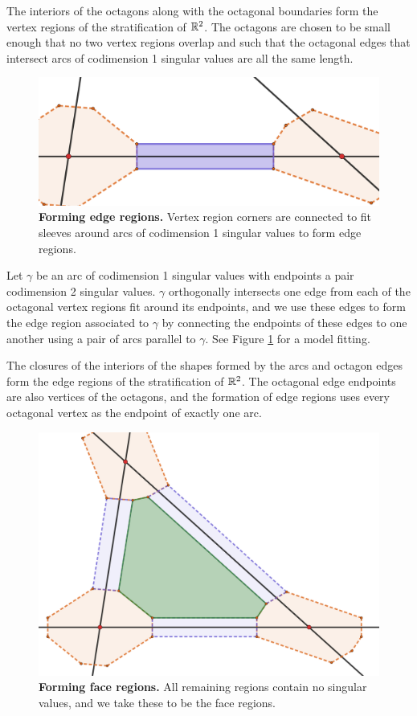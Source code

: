 The interiors of the octagons along with the octagonal boundaries form the vertex regions of the stratification of $\mathbb{R}^2$.
The octagons are chosen to be small enough that no two vertex regions overlap and such that the octagonal edges that intersect arcs of codimension 1 singular values are all the same length.

\begin{figure}[h!]
	\centering
	\includegraphics[width=\textwidth]{figures/edge-sleeve.png}
	\caption{
		\textbf{Forming edge regions.}
		Vertex region corners are connected to fit sleeves around arcs of codimension 1 singular values to form edge regions.
	}
	\label{fig:edge-sleeve}
\end{figure}

Let $\gamma$ be an arc of codimension 1 singular values with endpoints a pair codimension 2 singular values.
$\gamma$ orthogonally intersects one edge from each of the octagonal vertex regions fit around its endpoints, and we use these edges to form the edge region associated to $\gamma$ by connecting the endpoints of these edges to one another using a pair of arcs parallel to $\gamma$.
See Figure \ref{fig:edge-sleeve} for a model fitting.

The closures of the interiors of the shapes formed by the arcs and octagon edges form the edge regions of the stratification of $\mathbb{R}^2$.
The octagonal edge endpoints are also vertices of the octagons, and the formation of edge regions uses every octagonal vertex as the endpoint of exactly one arc.

\begin{figure}[h!]
	\centering
	\includegraphics[width=\textwidth]{figures/face-sleeve.png}
	\caption{
		\textbf{Forming face regions.}
		All remaining regions contain no singular values, and we take these to be the face regions.
	}
	\label{fig:face-sleeve}
\end{figure}

